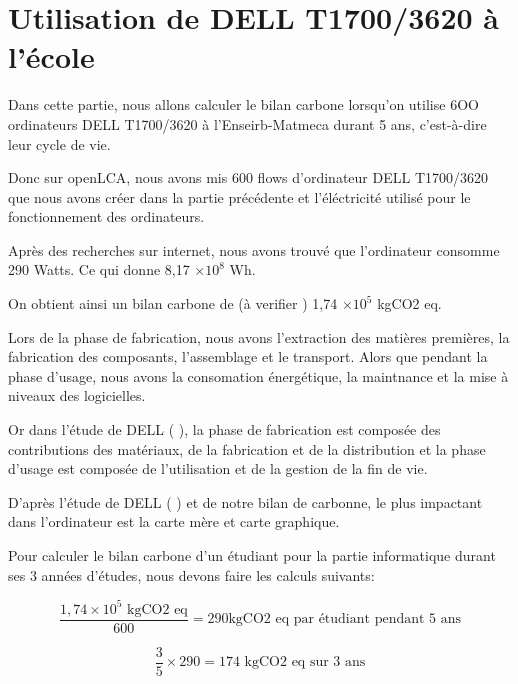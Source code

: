 \section{Utilisation de DELL T1700/3620 à l'école}

Dans cette partie, nous allons calculer le bilan carbone lorsqu'on utilise 6OO ordinateurs DELL T1700/3620 à l'Enseirb-Matmeca durant 5 ans, c'est-à-dire leur cycle de vie.

Donc sur openLCA, nous avons mis 600 flows d'ordinateur DELL T1700/3620 que nous avons créer dans la partie précédente et l'éléctricité utilisé pour le fonctionnement des ordinateurs.

Après des recherches sur internet, nous avons trouvé que l'ordinateur consomme 290 Watts. Ce qui donne 8,17 $ \times 10^8$ Wh.

On obtient ainsi un bilan carbone de (à verifier ) 1,74 $\times 10^5$ kgCO2 eq.



Lors de la phase de fabrication, nous avons l'extraction des matières premières, la fabrication des composants, l'assemblage et le transport. Alors que pendant la phase d'usage, nous avons la consomation énergétique, la maintnance et la mise à niveaux des logicielles.

Or dans l'étude de DELL ( \citep{dell2018carbon} ), la phase de fabrication est composée des contributions des matériaux, de la fabrication et de la distribution et la phase d'usage est composée de l'utilisation et de la gestion de la fin de vie.


D'après l'étude de DELL ( \citep{dell2018carbon} ) et de notre bilan de carbonne, le plus impactant dans l'ordinateur est la carte mère et carte graphique.



Pour calculer le bilan carbone d'un étudiant pour la partie informatique durant ses 3 années d'études, nous devons faire les calculs suivants:

\begin{equation*}
    \frac{1,74 \times 10^5 \text{ kgCO2 eq}}{600} = 290 \text{kgCO2 eq par étudiant pendant 5 ans} 
\end{equation*}

\begin{equation*}
    \frac{3}{5} \times 290 = 174 \text{ kgCO2 eq sur 3 ans}
\end{equation*}